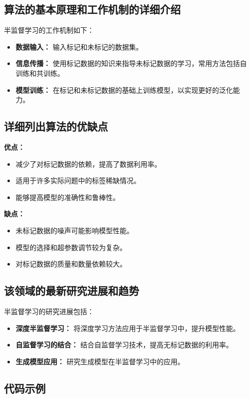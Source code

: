 \subsection*{算法的基本原理和工作机制的详细介绍}
半监督学习的工作机制如下：
\begin{itemize}
    \item \textbf{数据输入：} 输入标记和未标记的数据集。
    \item \textbf{信息传播：} 使用标记数据的知识来指导未标记数据的学习，常用方法包括自训练和共训练。
    \item \textbf{模型训练：} 在标记和未标记数据的基础上训练模型，以实现更好的泛化能力。
\end{itemize}

\subsection*{详细列出算法的优缺点}
\textbf{优点：}
\begin{itemize}
    \item 减少了对标记数据的依赖，提高了数据利用率。
    \item 适用于许多实际问题中的标签稀缺情况。
    \item 能够提高模型的准确性和鲁棒性。
\end{itemize}

\textbf{缺点：}
\begin{itemize}
    \item 未标记数据的噪声可能影响模型性能。
    \item 模型的选择和超参数调节较为复杂。
    \item 对标记数据的质量和数量依赖较大。
\end{itemize}

\subsection*{该领域的最新研究进展和趋势}
半监督学习的研究进展包括：
\begin{itemize}
    \item \textbf{深度半监督学习：} 将深度学习方法应用于半监督学习中，提升模型性能。
    \item \textbf{自监督学习的结合：} 结合自监督学习技术，提高无标记数据的利用率。
    \item \textbf{生成模型应用：} 研究生成模型在半监督学习中的应用。
\end{itemize}
\subsection*{代码示例}
\begin{lstlisting}

\end{lstlisting}


